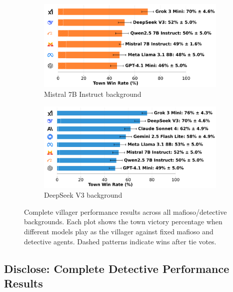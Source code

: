 \documentclass{article}
\begin{document}
\begin{figure}[htbp]
    \begin{subfigure}[b]{0.48\textwidth}
        \centering
        \includegraphics[width=\textwidth]{../results/villager_mistral_7b_instruct_db_benchmark.png}
        \caption{Mistral 7B Instruct background}
        \label{fig:villager_mistral_appendix}
    \end{subfigure}
    \hfill
    \begin{subfigure}[b]{0.48\textwidth}
        \centering
        \includegraphics[width=\textwidth]{../results/villager_deepseek_v3_db_benchmark.png}
        \caption{DeepSeek V3 background}
        \label{fig:villager_deepseek_appendix}
    \end{subfigure}
    \caption{Complete villager performance results across all mafioso/detective backgrounds. Each plot shows the town victory percentage when different models play as the villager against fixed mafioso and detective agents. Dashed patterns indicate wins after tie votes.}
    \label{fig:villager_complete}
\end{figure}

\subsection{Disclose: Complete Detective Performance Results}
\end{document}
